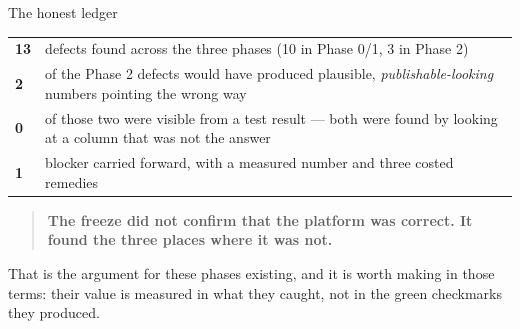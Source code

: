\documentclass[10pt,aspectratio=169]{beamer}
\begin{document}
\begin{frame}{The honest ledger}
  \small
  \begin{table}\small
    \begin{tabular}{@{}lp{8.4cm}@{}}
      \toprule
      \textbf{13} & defects found across the three phases
                    (10 in Phase 0/1, 3 in Phase 2) \\
      \addlinespace
      \textbf{2}  & of the Phase 2 defects would have produced plausible,
                    \emph{publishable-looking} numbers pointing the wrong way \\
      \addlinespace
      \textbf{0}  & of those two were visible from a test result --- both were
                    found by looking at a column that was not the answer \\
      \addlinespace
      \textbf{1}  & blocker carried forward, with a measured number and three
                    costed remedies \\
      \bottomrule
    \end{tabular}
  \end{table}

  \vspace{-1mm}
  \begin{quote}
    \textbf{The freeze did not confirm that the platform was correct. It found
    the three places where it was not.}
  \end{quote}

  \medskip
  That is the argument for these phases existing, and it is worth making in
  those terms: their value is measured in what they caught, not in the green
  checkmarks they produced.
\end{frame}
\end{document}
